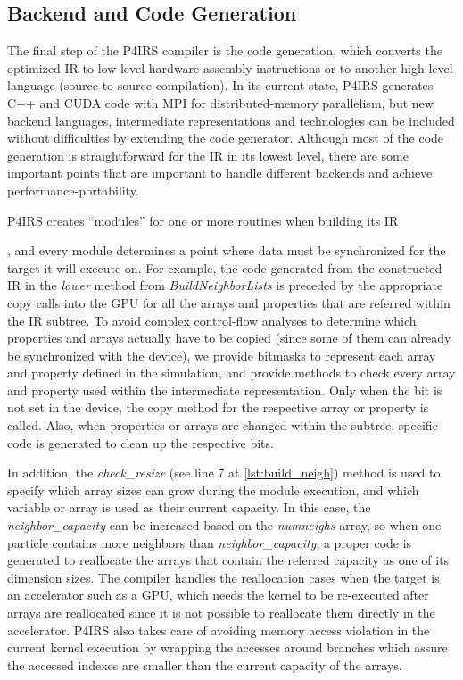 \documentclass[Afour,sageh,times]{sagej}
\newcommand{\RMchange}[1]{{\color{blue} #1}}
\begin{document}
\subsection{Backend and Code Generation}
\label{sec:backend}

\RMchange{
The final step of the P4IRS compiler is the code generation, which converts the optimized \ac{IR} to low-level hardware assembly instructions or to another high-level language (source-to-source compilation).
In its current state, P4IRS generates C++ and CUDA code with MPI for distributed-memory parallelism, but new backend languages, intermediate representations and technologies can be included without difficulties by extending the code generator.
Although most of the code generation is straightforward for the \ac{IR} in its lowest level, there are some important points that are important to handle different backends and achieve performance-portability.

P4IRS creates ``modules'' for one or more routines when building its IR}, and every module determines a point where data must be synchronized for the target it will execute on.
For example, the code generated from the constructed IR in the \emph{lower} method from \emph{BuildNeighborLists} is preceded by the appropriate copy calls into the GPU for all the arrays and properties that are referred within the IR subtree.
To avoid complex control-flow analyses to determine which properties and arrays actually have to be copied (since some of them can already be synchronized with the device), we provide bitmasks to represent each array and property defined in the simulation, and provide methods to check every array and property used within the intermediate representation.
Only when the bit is not set in the device, the copy method for the respective array or property is called.
Also, when properties or arrays are changed within the subtree, specific code is generated to clean up the respective bits.

\RMchange{In addition,} the \emph{check\_resize} (see line 7 at \autoref{lst:build_neigh}) method is used to specify which array sizes can grow during the module execution, and which variable or array is used as their current capacity.
In this case, the \emph{neighbor\_capacity} can be increased based on the \emph{numneighs} array, so when one particle contains more neighbors than \emph{neighbor\_capacity}, a proper code is generated to reallocate the arrays that contain the referred capacity as one of its dimension sizes.
The compiler handles the reallocation cases when the target is an accelerator such as a GPU, which needs the kernel to be re-executed after arrays are reallocated since it is not possible to reallocate them directly in the accelerator.
P4IRS also takes care of avoiding memory access violation in the current kernel execution by wrapping the accesses around branches which assure the accessed indexes are smaller than the current capacity of the arrays.
\end{document}
